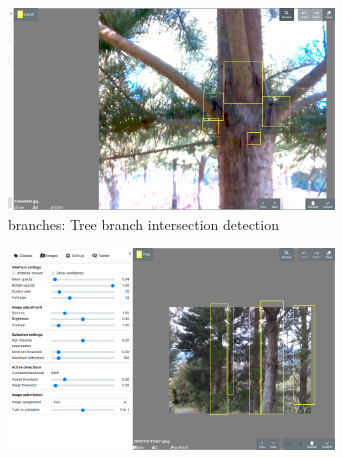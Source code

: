 \begin{figure}[h!]
\begin{subfigure}[t]{0.5\textwidth}
  \includegraphics[width=0.95\textwidth]{figures/annotation/screenshots/branches3.png}
  \caption{branches: Tree branch intersection detection}
\end{subfigure}%
\begin{subfigure}[t]{0.5\textwidth}
  \includegraphics[width=0.95\textwidth]{figures/annotation/screenshots/josh_trees.png}
  \caption{}
\end{subfigure}

\caption{ }
\label {fig:dataset_images}
\end{figure}